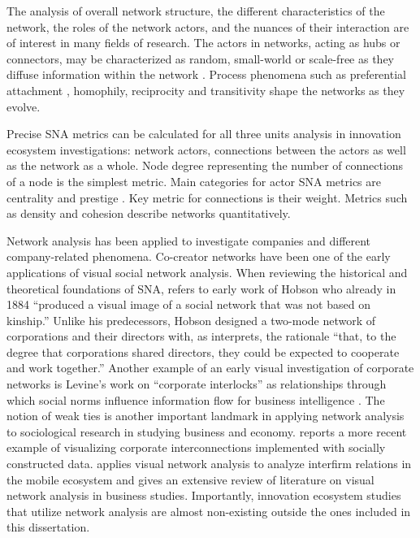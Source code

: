 The analysis of overall network structure, the different characteristics of the network, the roles of the network actors, and the nuances of their interaction are of interest in many fields of research. The actors in networks, acting as hubs or connectors, may be characterized as random, small-world \citep{Watts1998,Milgram1967TheProblem} or scale-free \citep{Barabasi2003} as they diffuse information within the network \citep[cf.][]{Molka-Danielsen2007IRISAnalysis}. Process phenomena such as preferential attachment \citep{Barabasi1999EmergenceNetworks}, homophily, reciprocity and transitivity \citep[cf.][]{Giuliani2008} shape the networks as they evolve.

Precise SNA metrics can be calculated for all three units analysis in innovation ecosystem investigations: network actors, connections between the actors as well as the network as a whole. Node degree representing the number of connections of a node is the simplest metric. Main categories for actor SNA metrics are centrality and prestige \citep{Wasserman1994SocialApplications}. Key metric for connections is their weight. Metrics such as density and cohesion \citep{Hansen2011AnalyzingWorld} describe networks quantitatively.

Network analysis has been applied to investigate companies and different company-related phenomena. Co-creator networks have been one of the early applications of visual social network analysis. When reviewing the historical and theoretical foundations of SNA, \cite{Freeman2009MethodsVisualization} refers to early work of Hobson who already in 1884 ``produced a visual image of a social network that was not based on kinship.'' Unlike his predecessors, Hobson designed a two-mode network of corporations and their directors with, as \cite{Freeman2009MethodsVisualization} interprets, the rationale ``that, to the degree that corporations shared directors, they could be expected to cooperate and work together.'' Another example of an early visual investigation of corporate networks is Levine's work on ``corporate interlocks'' as relationships through which social norms influence information flow for business intelligence \citep{Levine1979Joint-spaceAlternatives}. The notion of weak ties \citep{Granovetter1973TheTies} is another important landmark in applying network analysis to sociological research in studying business and economy. \cite{Olson2008GreatAPI} reports a more recent example of visualizing corporate interconnections implemented with socially constructed data. \cite{Basole2009VisualizationEcosystem} applies visual network analysis to analyze interfirm relations in the mobile ecosystem and gives an extensive review of literature on visual network analysis in business studies. Importantly, innovation ecosystem studies that utilize network analysis are almost non-existing outside the ones included in this dissertation.

